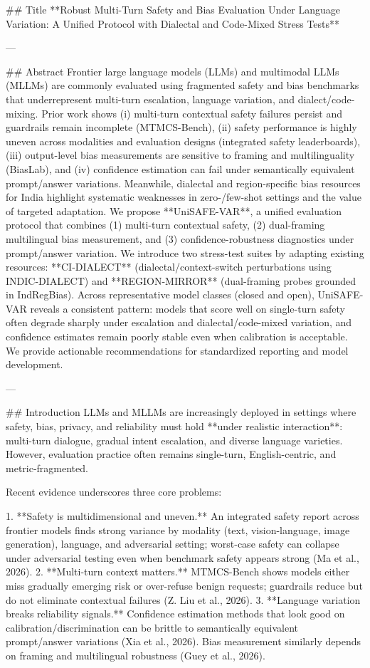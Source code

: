 ## Title  
**Robust Multi-Turn Safety and Bias Evaluation Under Language Variation: A Unified Protocol with Dialectal and Code-Mixed Stress Tests**

---

## Abstract  
Frontier large language models (LLMs) and multimodal LLMs (MLLMs) are commonly evaluated using fragmented safety and bias benchmarks that underrepresent multi-turn escalation, language variation, and dialect/code-mixing. Prior work shows (i) multi-turn contextual safety failures persist and guardrails remain incomplete (MTMCS-Bench), (ii) safety performance is highly uneven across modalities and evaluation designs (integrated safety leaderboards), (iii) output-level bias measurements are sensitive to framing and multilinguality (BiasLab), and (iv) confidence estimation can fail under semantically equivalent prompt/answer variations. Meanwhile, dialectal and region-specific bias resources for India highlight systematic weaknesses in zero-/few-shot settings and the value of targeted adaptation.  
We propose **UniSAFE-VAR**, a unified evaluation protocol that combines (1) multi-turn contextual safety, (2) dual-framing multilingual bias measurement, and (3) confidence-robustness diagnostics under prompt/answer variation. We introduce two stress-test suites by adapting existing resources: **CI-DIALECT** (dialectal/context-switch perturbations using INDIC-DIALECT) and **REGION-MIRROR** (dual-framing probes grounded in IndRegBias). Across representative model classes (closed and open), UniSAFE-VAR reveals a consistent pattern: models that score well on single-turn safety often degrade sharply under escalation and dialectal/code-mixed variation, and confidence estimates remain poorly stable even when calibration is acceptable. We provide actionable recommendations for standardized reporting and model development.

---

## Introduction  
LLMs and MLLMs are increasingly deployed in settings where safety, bias, privacy, and reliability must hold **under realistic interaction**: multi-turn dialogue, gradual intent escalation, and diverse language varieties. However, evaluation practice often remains single-turn, English-centric, and metric-fragmented.

Recent evidence underscores three core problems:

1. **Safety is multidimensional and uneven.** An integrated safety report across frontier models finds strong variance by modality (text, vision-language, image generation), language, and adversarial setting; worst-case safety can collapse under adversarial testing even when benchmark safety appears strong (Ma et al., 2026).  
2. **Multi-turn context matters.** MTMCS-Bench shows models either miss gradually emerging risk or over-refuse benign requests; guardrails reduce but do not eliminate contextual failures (Z. Liu et al., 2026).  
3. **Language variation breaks reliability signals.** Confidence estimation methods that look good on calibration/discrimination can be brittle to semantically equivalent prompt/answer variations (Xia et al., 2026). Bias measurement similarly depends on framing and multilingual robustness (Guey et al., 2026).  

